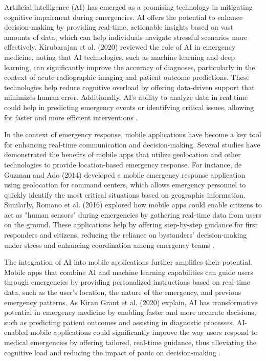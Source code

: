 Artificial intelligence (AI) has emerged as a promising technology in mitigating cognitive impairment during emergencies. AI offers the potential to enhance decision-making by providing real-time, actionable insights based on vast amounts of data, which can help individuals navigate stressful scenarios more effectively. Kirubarajan et al. (2020) reviewed the role of AI in emergency medicine, noting that AI technologies, such as machine learning and deep learning, can significantly improve the accuracy of diagnoses, particularly in the context of acute radiographic imaging and patient outcome predictions. These technologies help reduce cognitive overload by offering data-driven support that minimizes human error. Additionally, AI's ability to analyze data in real time could help in predicting emergency events or identifying critical issues, allowing for faster and more efficient interventions \cite{kirubarajan2020artificial}.

In the context of emergency response, mobile applications have become a key tool for enhancing real-time communication and decision-making. Several studies have demonstrated the benefits of mobile apps that utilize geolocation and other technologies to provide location-based emergency response. For instance, de Guzman and Ado (2014) developed a mobile emergency response application using geolocation for command centers, which allows emergency personnel to quickly identify the most critical situations based on geographic information. Similarly, Romano et al. (2016) explored how mobile apps could enable citizens to act as "human sensors" during emergencies by gathering real-time data from users on the ground. These applications help by offering step-by-step guidance for first responders and citizens, reducing the reliance on bystanders’ decision-making under stress and enhancing coordination among emergency teams \cite{deguzman2014mobile, romano2016designing}.

The integration of AI into mobile applications further amplifies their potential. Mobile apps that combine AI and machine learning capabilities can guide users through emergencies by providing personalized instructions based on real-time data, such as the user’s location, the nature of the emergency, and previous emergency patterns. As Kiran Grant et al. (2020) explain, AI has transformative potential in emergency medicine by enabling faster and more accurate decisions, such as predicting patient outcomes and assisting in diagnostic processes. AI-enabled mobile applications could significantly improve the way users respond to medical emergencies by offering tailored, real-time guidance, thus alleviating the cognitive load and reducing the impact of panic on decision-making \cite{kiran2020artificial}.

